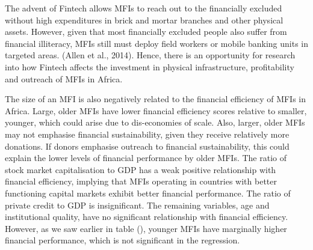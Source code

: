 \documentclass[
]{article}
\begin{document}
The advent of Fintech allows MFIs to reach out to the financially
excluded without high expenditures in brick and mortar branches and
other physical assets. However, given that most financially excluded
people also suffer from financial illiteracy, MFIs still must deploy
field workers or mobile banking units in targeted areas. (Allen et al.,
2014). Hence, there is an opportunity for research into how Fintech
affects the investment in physical infrastructure, profitability and
outreach of MFIs in Africa.

The size of an MFI is also negatively related to the financial
efficiency of MFIs in Africa. Large, older MFIs have lower financial
efficiency scores relative to smaller, younger, which could arise due to
dis-economies of scale. Also, larger, older MFIs may not emphasise
financial sustainability, given they receive relatively more donations.
If donors emphasise outreach to financial sustainability, this could
explain the lower levels of financial performance by older MFIs. The
ratio of stock market capitalisation to GDP has a weak positive
relationship with financial efficiency, implying that MFIs operating in
countries with better functioning capital markets exhibit better
financial performance. The ratio of private credit to GDP is
insignificant. The remaining variables, age and institutional quality,
have no significant relationship with financial efficiency. However, as
we saw earlier in table (), younger MFIs have marginally higher
financial performance, which is not significant in the regression.

\newpage
\end{document}
